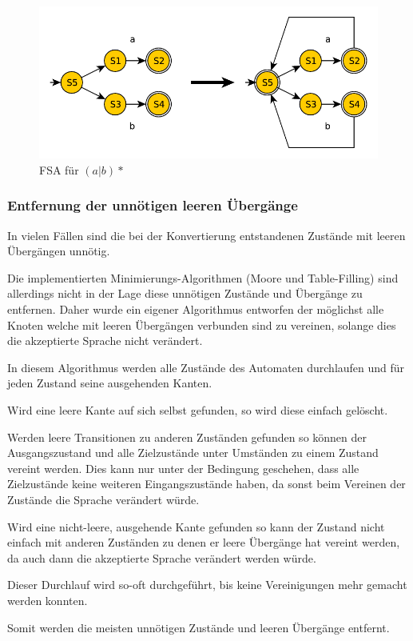 \begin{figure}[H]
  \begin{center}
  \includegraphics{objectsToInclude/re_fsa_(aOrb)STAR.pdf}
  \caption{FSA für $(a|b)*$}
  \label{fig:Kleene-Stern}
  \end{center}
\end{figure}

\subsubsection{Entfernung der unnötigen leeren Übergänge}
In vielen Fällen sind die bei der Konvertierung entstandenen Zustände mit leeren
Übergängen unnötig.

Die implementierten Minimierungs-Algorithmen (Moore und Table-Filling) sind
allerdings nicht in der Lage diese unnötigen Zustände und Übergänge zu entfernen.
Daher wurde ein eigener Algorithmus entworfen der möglichst alle Knoten welche mit
leeren Übergängen verbunden sind zu vereinen, solange dies die akzeptierte Sprache
nicht verändert.

In diesem Algorithmus werden alle Zustände des Automaten durchlaufen und für
jeden Zustand seine ausgehenden Kanten.

Wird eine leere Kante auf sich selbst gefunden, so wird diese einfach gelöscht.

Werden leere Transitionen zu anderen Zuständen gefunden so können der
Ausgangszustand und alle Zielzustände unter Umständen zu einem Zustand vereint
werden. Dies kann nur unter der Bedingung geschehen, dass alle Zielzustände keine
weiteren Eingangszustände haben, da sonst beim Vereinen der Zustände die Sprache
verändert würde.

Wird eine nicht-leere, ausgehende Kante gefunden so kann der Zustand nicht einfach
mit anderen Zuständen zu denen er leere Übergänge hat vereint werden, da auch
dann die akzeptierte Sprache verändert werden würde.

Dieser Durchlauf wird so-oft durchgeführt, bis keine Vereinigungen mehr gemacht
werden konnten.

Somit werden die meisten unnötigen Zustände und leeren Übergänge entfernt.


